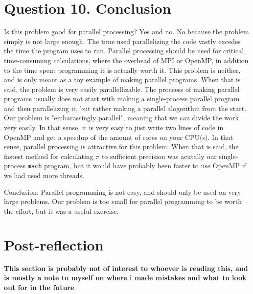 \documentclass[12pt]{article}
\begin{document}
\section{Question 10. Conclusion}
Is this problem good for parallel processing? Yes and no. No because the problem simply is not large enough. The time used parallelizing the code vastly excedes the time the program uses to run.
Parallel processing should be used for critical, time-consuming calculations, where the overhead of MPI or OpenMP, in addition to the time spent programming it is actually worth it.
This problem is neither, and is only meant as a toy example of making parallel programs. When that is said, the problem is very easily parallellizable.
The proccess of making parallel programs usually does not start with making a single-process parallel program and then parallelizing it, but rather making a parallel alogorithm from the start.
Our problem is "embarassingly parallel", meaning that we can divide the work very easily. In that sense, it is very easy to just write two lines of code in OpenMP and get a speedup of the amount
of cores on your CPU(s). In that sense, parallel processing is attractive for this problem. When that is said, the fastest method for calculating $\pi$ to sufficient precision
was acutally our single-process \texttt{mach} program, but it would have probably been faster to use OpenMP if we had used more threads. 

Conclusion: Parallel programming is not easy, and should only be used on very large problems. Our problem is too small for parallel programming to be worth the effort,
but it was a useful exercise.

\section{Post-reflection}
\textbf{This section is probably not of interest to whoever is reading this, and is mostly a note to myself on where i made mistakes and what to look out for in the future}.
\end{document}
